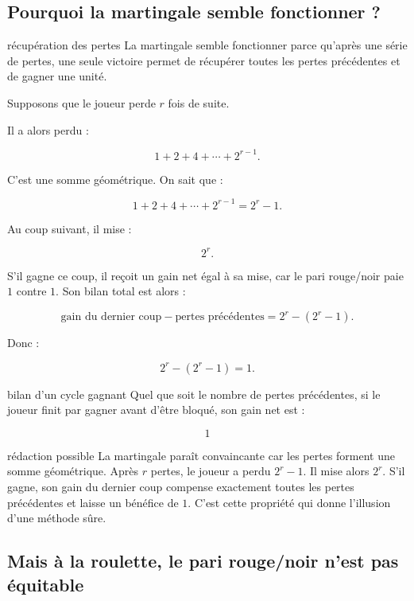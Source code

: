\documentclass[11pt,a4paper]{article}
\begin{document}
\subsection{Pourquoi la martingale semble fonctionner ?}

\begin{idee}{récupération des pertes}
La martingale semble fonctionner parce qu'après une série de pertes, une seule victoire permet de récupérer toutes les pertes précédentes et de gagner une unité.
\end{idee}

Supposons que le joueur perde \(r\) fois de suite.

Il a alors perdu :

\[
1+2+4+\cdots+2^{r-1}.
\]

C'est une somme géométrique. On sait que :

\[
1+2+4+\cdots+2^{r-1}=2^r-1.
\]

Au coup suivant, il mise :

\[
2^r.
\]

S'il gagne ce coup, il reçoit un gain net égal à sa mise, car le pari rouge/noir paie \(1\) contre \(1\). Son bilan total est alors :

\[
\text{gain du dernier coup} - \text{pertes précédentes}
=
2^r-(2^r-1).
\]

Donc :

\[
2^r-(2^r-1)=1.
\]

\begin{equationbox}{bilan d'un cycle gagnant}
Quel que soit le nombre de pertes précédentes, si le joueur finit par gagner avant d'être bloqué, son gain net est :

\[
\boxed{1}
\]
\end{equationbox}

\begin{oral}{rédaction possible}
La martingale paraît convaincante car les pertes forment une somme géométrique. Après \(r\) pertes, le joueur a perdu \(2^r-1\). Il mise alors \(2^r\). S'il gagne, son gain du dernier coup compense exactement toutes les pertes précédentes et laisse un bénéfice de \(1\). C'est cette propriété qui donne l'illusion d'une méthode sûre.
\end{oral}

\subsection{Mais à la roulette, le pari rouge/noir n'est pas équitable}
\end{document}
